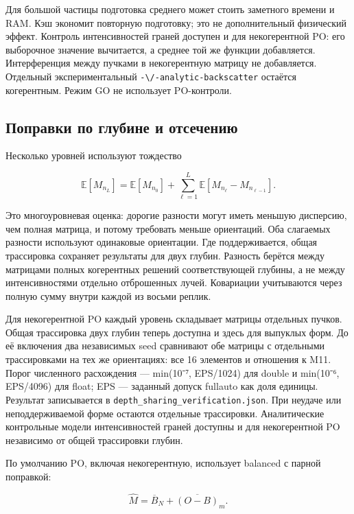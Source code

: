Для большой частицы подготовка среднего может стоить заметного времени и
RAM. Кэш экономит повторную подготовку; это не дополнительный физический
эффект. Контроль интенсивностей граней доступен и для некогерентной PO:
его выборочное значение вычитается, а среднее той же функции
добавляется. Интерференция между пучками в некогерентную матрицу не
добавляется. Отдельный экспериментальный
\nolinkurl{-\/-analytic-backscatter} остаётся когерентным. Режим GO не
использует PO-контроли.

\subsection{Поправки по глубине и
отсечению}\label{ux43fux43eux43fux440ux430ux432ux43aux438-ux43fux43e-ux433ux43bux443ux431ux438ux43dux435-ux438-ux43eux442ux441ux435ux447ux435ux43dux438ux44e}

Несколько уровней используют тождество

\[\mathbb E[M_{n_L}]=\mathbb E[M_{n_0}]
+\sum_{\ell=1}^{L}\mathbb E[M_{n_\ell}-M_{n_{\ell-1}}].\]

Это многоуровневая оценка: дорогие разности могут иметь меньшую
дисперсию, чем полная матрица, и потому требовать меньше ориентаций. Оба
слагаемых разности используют одинаковые ориентации. Где поддерживается,
общая трассировка сохраняет результаты для двух глубин. Разность берётся
между матрицами полных когерентных решений соответствующей глубины, а не
между интенсивностями отдельно отброшенных лучей. Ковариации учитываются
через полную сумму внутри каждой из восьми реплик.

Для некогерентной PO каждый уровень складывает матрицы отдельных пучков.
Общая трассировка двух глубин теперь доступна и здесь для выпуклых форм.
До её включения два независимых seed сравнивают обе матрицы с отдельными
трассировками на тех же ориентациях: все 16 элементов и отношения к M11.
Порог численного расхождения --- min(10⁻⁷, EPS/1024) для double и
min(10⁻⁶, EPS/4096) для float; EPS --- заданный допуск fullauto как доля
единицы. Результат записывается в
\nolinkurl{depth_sharing_verification.json}. При неудаче или
неподдерживаемой форме остаются отдельные трассировки. Аналитические
контрольные модели интенсивностей граней доступны и для некогерентной PO
независимо от общей трассировки глубин.

По умолчанию PO, включая некогерентную, использует balanced с парной
поправкой:

\[\widehat M=\overline{B}_N+\overline{(O-B)}_m.\]

